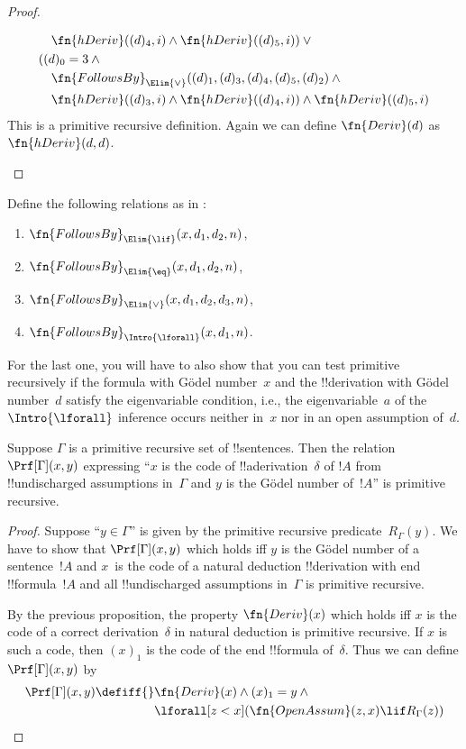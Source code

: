 \documentclass[../../../include/open-logic-section]{subfiles}
\begin{document}
\begin{proof}
\begin{enumerate}
\begin{multline*}
\begin{aligned}
& \quad \fn{hDeriv}((d)_4, i) \land \fn{hDeriv}((d)_5, i)) \lor {}\\
& ((d)_0 = 3 \land {}\\
& \quad \fn{FollowsBy}_{\Elim{\lor}}((d)_1, (d)_3, (d)_4, (d)_5, (d)_2) \land{}\\
& \quad \fn{hDeriv}((d)_3, i) \land \fn{hDeriv}((d)_4, i)) \land \fn{hDeriv}((d)_5, i)  
  \end{aligned}
  \end{multline*}
This is a primitive recursive definition. Again we can define
$\fn{Deriv}(d)$ as $\fn{hDeriv}(d, d)$.
\end{enumerate}
\end{proof}

\begin{prob}
Define the following relations as in
:
\begin{enumerate}
\item $\fn{FollowsBy}_{\Elim{\lif}}(x, d_1, d_2, n)$,
\item $\fn{FollowsBy}_{\Elim{\eq}}(x, d_1, d_2, n)$,
\item $\fn{FollowsBy}_{\Elim{\lor}}(x, d_1, d_2, d_3, n)$,
\item $\fn{FollowsBy}_{\Intro{\lforall}}(x, d_1, n)$.
\end{enumerate}
For the last one, you will have to also show that you can test
primitive recursively if the formula with G\"odel number~$x$ and the
!!{derivation} with G\"odel number~$d$ satisfy the eigenvariable
condition, i.e., the eigenvariable~$a$ of the $\Intro{\lforall}$
inference occurs neither in~$x$ nor in an open assumption of~$d$.
\end{prob}

\begin{prop}
Suppose $\Gamma$ is a primitive recursive set of !!{sentence}s.  Then
the relation $\Prf[\Gamma](x, y)$ expressing ``$x$ is the code of
!!a{derivation}~$\delta$ of $!A$ from !!{undischarged} assumptions
in~$\Gamma$ and $y$ is the G\"odel number of~$!A$'' is primitive
recursive.
\end{prop}

\begin{proof}
Suppose ``$y \in \Gamma$'' is given by the primitive recursive
predicate~$R_\Gamma(y)$.  We have to show that $\Prf[\Gamma](x, y)$
which holds iff $y$ is the G\"odel number of a sentence~$!A$ and
$x$~is the code of a natural deduction !!{derivation} with end
!!{formula}~$!A$ and all !!{undischarged} assumptions in~$\Gamma$ is
primitive recursive.

By the previous proposition, the property $\fn{Deriv}(x)$ which holds
iff $x$ is the code of a correct derivation~$\delta$ in natural
deduction is primitive recursive. If $x$ is such a code, then $(x)_1$
is the code of the end !!{formula} of~$\delta$. Thus we can define
$\Prf[\Gamma](x, y)$ by
\begin{align*}
\Prf[\Gamma](x, y) \defiff {} &
\fn{Deriv}(x) \land (x)_1 = y \land {} \\
& \lforall[z < x](\fn{OpenAssum}(z, x) \lif R_\Gamma(z))
\end{align*}
\end{proof}
\end{document}
